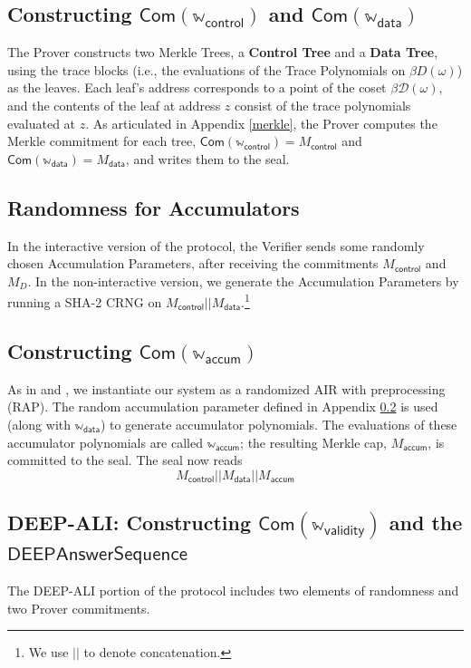 \documentclass[10pt,letterpaper,titlepage]{article}
\newcommand{\w}[0]{\omega}
\newcommand{\D}[0]{\mathcal{D}}
\theoremstyle{definition}
\begin{document}
\begin{appendices}
\subsection{Constructing $\mathsf{Com}(\mathbb{w}_\mathsf{control})$ and $\mathsf{Com}(\mathbb{w}_\mathsf{data})$}
\label{merkle trace}
The Prover constructs two Merkle Trees, a \textbf{Control Tree} and a \textbf{Data Tree}, using the trace blocks (i.e., the evaluations of the Trace Polynomials on $\beta D(\w)$) as the leaves. 
Each leaf's address corresponds to a point of the coset $\beta\D(\w)$, and the contents of the leaf at address $z$ consist of the trace polynomials evaluated at $z$.
As articulated in Appendix \ref{merkle}, the Prover computes the Merkle commitment for each tree, $\mathsf{Com}(\mathbb{w}_\mathsf{control})=M_\mathsf{control}$ and $\mathsf{Com}(\mathbb{w}_\mathsf{data})=M_\mathsf{data}$, and writes them to the seal. 

\subsection{Randomness for Accumulators}
\label{accum randomness}
In the interactive version of the protocol, the Verifier sends some randomly chosen Accumulation Parameters, after receiving the commitments $M_\mathsf{control}$ and $M_{D}$. 
In the non-interactive version, we generate the Accumulation Parameters by running a SHA-2 CRNG on $M_\mathsf{control}||M_\mathsf{data}$.\footnote{We use $||$ to denote concatenation.}

\subsection{Constructing $\mathsf{Com}(\mathbb{w}_\mathsf{accum})$ }
\label{committing accum}
As in \cite{cairo} and \cite{RAP}, we instantiate our system as a randomized AIR with preprocessing (RAP). 
The random accumulation parameter defined in Appendix \ref{accum randomness} is used (along with $\mathbb{w}_\mathsf{data}$) to generate accumulator polynomials.
The evaluations of these accumulator polynomials are called $\mathbb{w}_\mathsf{accum}$; the resulting Merkle cap, $M_\mathsf{accum}$, is committed to the seal. 
The seal now reads
\[
  M_\mathsf{control}||
  M_\mathsf{data}||
  M_\mathsf{accum}
\]

\subsection{DEEP-ALI: Constructing $\mathsf{Com}(\mathbb{w}_\mathsf{validity})$ and the $\mathsf{DEEPAnswerSequence}$}
The DEEP-ALI portion of the protocol includes two elements of randomness and two Prover commitments. 

\end{appendices}
\end{document}
